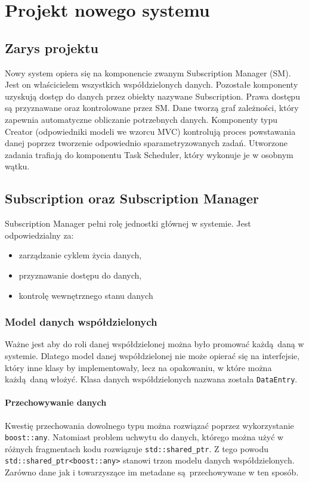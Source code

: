 \chapter{Projekt nowego systemu}

\section{Zarys projektu}
Nowy system opiera się na komponencie zwanym Subscription Manager (SM). Jest on właścicielem wszystkich współdzielonych danych. Pozostałe komponenty uzyskują dostęp do danych przez obiekty nazywane Subscription. Prawa dostępu są przyznawane oraz kontrolowane przez SM. Dane tworzą graf zależności, który zapewnia automatyczne obliczanie potrzebnych danych. Komponenty typu Creator (odpowiedniki modeli we wzorcu MVC) kontrolują proces powstawania danej poprzez tworzenie odpowiednio sparametryzowanych zadań. Utworzone zadania trafiają do komponentu Task Scheduler, który wykonuje je w osobnym wątku.

\section{Subscription oraz Subscription Manager}

Subscription Manager pełni rolę jednostki głównej w systemie. Jest odpowiedzialny za:
\begin{itemize}
	\item zarządzanie cyklem życia danych,
	\item przyznawanie dostępu do danych,
	\item kontrolę wewnętrznego stanu danych
\end{itemize}



\subsection{Model danych współdzielonych}
Ważne jest aby do roli danej współdzielonej można było promować każdą daną w systemie. Dlatego model danej współdzielonej nie może opierać się na interfejsie, który inne klasy by implementowały, lecz na opakowaniu, w które można każdą daną włożyć. Klasa danych współdzielonych nazwana została \lstinline$DataEntry$.


\subsubsection{Przechowywanie danych}
Kwestię przechowania dowolnego typu można rozwiązać poprzez wykorzystanie \lstinline$boost::any$. Natomiast problem uchwytu do danych, którego można użyć w różnych fragmentach kodu rozwiązuje \lstinline$std::shared_ptr$. Z tego powodu \lstinline$std::shared_ptr<boost::any>$ stanowi trzon modelu danych współdzielonych. Zarówno dane jak i towarzyszące im metadane są przechowywane w ten sposób. 
 
